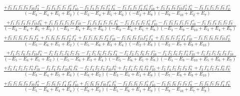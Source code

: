 \documentclass{article}
\begin{document}
\[\begin{array}{rcl}
\frac{+f_{3}^{-}f_{4}^{-}f_{5}^{-}f_{9}^{-}f_{10}^{-}f_{2}^{+}-f_{3}^{-}f_{4}^{-}f_{5}^{-}f_{7}^{-}f_{2}^{+}f_{10}^{+}-f_{3}^{-}f_{4}^{-}f_{7}^{-}f_{9}^{-}f_{2}^{+}f_{6}^{+}-f_{3}^{-}f_{4}^{-}f_{7}^{-}f_{2}^{+}f_{6}^{+}f_{10}^{+}+f_{3}^{-}f_{4}^{-}f_{9}^{-}f_{10}^{-}f_{2}^{+}f_{6}^{+}-f_{3}^{-}f_{4}^{-}f_{5}^{-}f_{7}^{-}f_{9}^{-}f_{2}^{+}}{(-E_{3}-E_{4}+E_{1}+E_{2})(-E_{3}-E_{4}+E_{5}+E_{6})(-E_{2}+E_{8})(-E_{9}-E_{10}+E_{2}+E_{7})}\\
\frac{+f_{1}^{-}f_{3}^{-}f_{4}^{-}f_{9}^{-}f_{10}^{-}f_{6}^{+}+f_{1}^{-}f_{3}^{-}f_{4}^{-}f_{5}^{-}f_{9}^{-}f_{10}^{-}-f_{1}^{-}f_{3}^{-}f_{4}^{-}f_{7}^{-}f_{9}^{-}f_{6}^{+}-f_{1}^{-}f_{3}^{-}f_{4}^{-}f_{7}^{-}f_{6}^{+}f_{10}^{+}-f_{1}^{-}f_{3}^{-}f_{4}^{-}f_{5}^{-}f_{7}^{-}f_{10}^{+}-f_{1}^{-}f_{3}^{-}f_{4}^{-}f_{5}^{-}f_{7}^{-}f_{9}^{-}}{(-E_{3}-E_{4}+E_{1}+E_{2})(-E_{3}-E_{4}+E_{5}+E_{6})(-E_{3}-E_{4}+E_{1}+E_{8})(-E_{1}-E_{9}-E_{10}+E_{3}+E_{4}+E_{7})}\\
\frac{+f_{3}^{-}f_{5}^{-}f_{6}^{-}f_{7}^{-}f_{9}^{-}f_{2}^{+}+f_{5}^{-}f_{6}^{-}f_{7}^{-}f_{9}^{-}f_{2}^{+}f_{4}^{+}+f_{3}^{-}f_{5}^{-}f_{6}^{-}f_{7}^{-}f_{2}^{+}f_{10}^{+}-f_{5}^{-}f_{6}^{-}f_{9}^{-}f_{10}^{-}f_{2}^{+}f_{4}^{+}+f_{5}^{-}f_{6}^{-}f_{7}^{-}f_{2}^{+}f_{4}^{+}f_{10}^{+}-f_{3}^{-}f_{5}^{-}f_{6}^{-}f_{9}^{-}f_{10}^{-}f_{2}^{+}}{(-E_{5}-E_{6}+E_{1}+E_{2})(-E_{5}-E_{6}+E_{3}+E_{4})(-E_{2}+E_{8})(-E_{2}-E_{7}+E_{9}+E_{10})}\\
\frac{+f_{1}^{-}f_{5}^{-}f_{6}^{-}f_{9}^{-}f_{10}^{-}f_{4}^{+}-f_{1}^{-}f_{3}^{-}f_{5}^{-}f_{6}^{-}f_{7}^{-}f_{9}^{-}-f_{1}^{-}f_{5}^{-}f_{6}^{-}f_{7}^{-}f_{9}^{-}f_{4}^{+}-f_{1}^{-}f_{3}^{-}f_{5}^{-}f_{6}^{-}f_{7}^{-}f_{10}^{+}-f_{1}^{-}f_{5}^{-}f_{6}^{-}f_{7}^{-}f_{4}^{+}f_{10}^{+}+f_{1}^{-}f_{3}^{-}f_{5}^{-}f_{6}^{-}f_{9}^{-}f_{10}^{-}}{(-E_{5}-E_{6}+E_{1}+E_{2})(-E_{5}-E_{6}+E_{3}+E_{4})(-E_{5}-E_{6}+E_{1}+E_{8})(-E_{1}-E_{9}-E_{10}+E_{5}+E_{6}+E_{7})}\\
\frac{+f_{3}^{-}f_{4}^{-}f_{5}^{-}f_{7}^{-}f_{8}^{+}f_{10}^{+}-f_{3}^{-}f_{4}^{-}f_{9}^{-}f_{10}^{-}f_{6}^{+}f_{8}^{+}-f_{3}^{-}f_{4}^{-}f_{5}^{-}f_{9}^{-}f_{10}^{-}f_{8}^{+}+f_{3}^{-}f_{4}^{-}f_{7}^{-}f_{6}^{+}f_{8}^{+}f_{10}^{+}+f_{3}^{-}f_{4}^{-}f_{5}^{-}f_{7}^{-}f_{9}^{-}f_{8}^{+}+f_{3}^{-}f_{4}^{-}f_{7}^{-}f_{9}^{-}f_{6}^{+}f_{8}^{+}}{(-E_{3}-E_{4}+E_{5}+E_{6})(-E_{8}+E_{2})(-E_{3}-E_{4}+E_{1}+E_{8})(-E_{7}-E_{8}+E_{9}+E_{10})}\\
\frac{+f_{3}^{-}f_{5}^{-}f_{6}^{-}f_{9}^{-}f_{10}^{-}f_{8}^{+}-f_{5}^{-}f_{6}^{-}f_{7}^{-}f_{4}^{+}f_{8}^{+}f_{10}^{+}+f_{5}^{-}f_{6}^{-}f_{9}^{-}f_{10}^{-}f_{4}^{+}f_{8}^{+}-f_{3}^{-}f_{5}^{-}f_{6}^{-}f_{7}^{-}f_{8}^{+}f_{10}^{+}-f_{3}^{-}f_{5}^{-}f_{6}^{-}f_{7}^{-}f_{9}^{-}f_{8}^{+}-f_{5}^{-}f_{6}^{-}f_{7}^{-}f_{9}^{-}f_{4}^{+}f_{8}^{+}}{(-E_{5}-E_{6}+E_{3}+E_{4})(-E_{8}+E_{2})(-E_{5}-E_{6}+E_{1}+E_{8})(-E_{9}-E_{10}+E_{7}+E_{8})}\\

\end{array}\]
\end{document}
